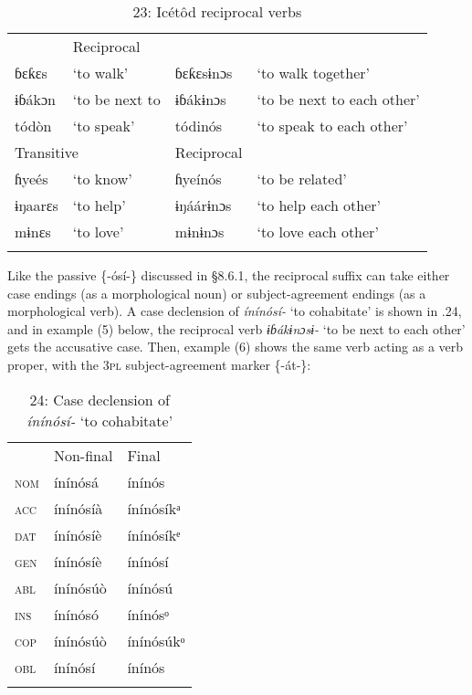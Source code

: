 \begin{table}
\caption{23: Icétôd reciprocal verbs}
\label{tab:8}


\begin{tabularx}{\textwidth}{XXXX}
\lsptoprule

\multicolumn{2}{X}{Intransitive} & \multicolumn{2}{X}{Reciprocal}\\
ɓɛƙɛs & ‘to walk’ & ɓɛƙɛsɨnɔs & ‘to walk together’\\
ɨɓákɔn & ‘to be next to & ɨɓákɨnɔs & ‘to be next to each other’\\
tódòn & ‘to speak’ & tódinós & ‘to speak to each other’\\
\multicolumn{2}{X}{Transitive} & Reciprocal & \\
ɦyeés & ‘to know’ & ɦyeínós & ‘to be related’\\
ɨŋaarɛs & ‘to help’ & ɨŋáárɨnɔs & ‘to help each other’\\
mɨnɛs & ‘to love’ & mɨnɨnɔs & ‘to love each other’\\
\lspbottomrule
\end{tabularx}
\end{table}
Like the passive \{-ósí-\} discussed in §8.6.1, the reciprocal suffix can take either case endings (as a morphological noun) or subject-agreement endings (as a morphological verb). A case declension of \textit{ínínósí-} ‘to cohabitate’ is shown in .24, and in example (5) below, the reciprocal verb \textit{ɨɓákɨnɔsɨ-} ‘to be next to each other’ gets the accusative case. Then, example (6) shows the same verb acting as a verb proper, with the 3\textsc{pl} subject-agreement marker \{-át-\}:


\begin{table}
\caption{24: Case declension of \textit{ínínósí-} ‘to cohabitate’}
\label{tab:8}


\begin{tabularx}{\textwidth}{XXX} & Non-final & Final\\
\lsptoprule
\textsc{nom} & ínínósá & ínínós\\
\textsc{acc} & ínínósíà & ínínósíkᵃ\\
\textsc{dat} & ínínósíè & ínínósíkᵉ\\
\textsc{gen} & ínínósíè & ínínósí\\
\textsc{abl} & ínínósúò & ínínósú\\
\textsc{ins} & ínínósó & ínínósᵒ\\
\textsc{cop} & ínínósúò & ínínósúkᵒ\\
\textsc{obl} & ínínósí & ínínós\\
\lspbottomrule
\end{tabularx}
\end{table}



